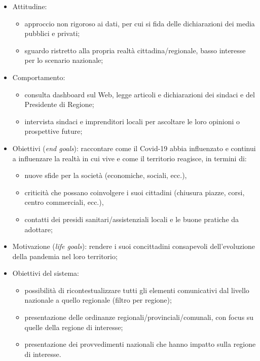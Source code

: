 \begin{itemize}
    \item Attitudine:
    \begin{itemize}
        \item approccio non rigoroso ai dati, per cui si fida delle dichiarazioni dei media pubblici e privati;
        \item sguardo ristretto alla propria realtà cittadina/regionale, basso interesse per lo scenario nazionale;
    \end{itemize}
	\item Comportamento: 
	\begin{itemize}
	    \item consulta dashboard sul Web, legge articoli e dichiarazioni dei sindaci e del Presidente di Regione;
	    \item intervista sindaci e imprenditori locali per ascoltare le loro opinioni o prospettive future;
    \end{itemize}
	\item Obiettivi (\textit{end goals}): raccontare come il Covid-19 abbia influenzato e continui a influenzare la realtà in cui vive e come il territorio reagisce, in termini di:
	\begin{itemize}
        \item nuove sfide per la società (economiche, sociali, ecc.),
        \item criticità che possano coinvolgere i suoi cittadini (chiusura piazze, corsi, centro commerciali, ecc.),
        \item contatti dei presidi sanitari/assistenziali locali e le buone pratiche da adottare;
    \end{itemize}
	\item Motivazione (\textit{life goals}): rendere i suoi concittadini consapevoli dell'evoluzione della pandemia nel loro territorio;
	\item Obiettivi del sistema:
    \begin{itemize}
        \item possibilità di ricontestualizzare tutti gli elementi comunicativi dal livello nazionale a quello regionale (filtro per regione);
        \item presentazione delle ordinanze regionali/provinciali/comunali, con focus su quelle della regione di interesse;
        \item presentazione dei provvedimenti nazionali che hanno impatto sulla regione di interesse.
    \end{itemize}
\end{itemize}